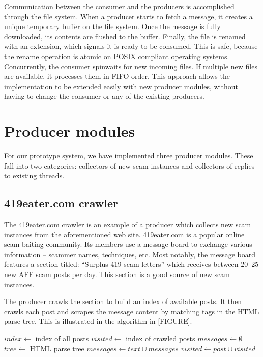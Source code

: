 Communication between the consumer and the producers is accomplished through the file system. When a producer starts to fetch a message, it creates a unique temporary buffer on the file system. Once the message is fully downloaded, its contents are flushed to the buffer. Finally, the file is renamed with an extension, which signals it is ready to be consumed. This is safe, because the rename operation is atomic on POSIX compliant operating systems. Concurrently, the consumer spinwaits for new incoming files. If multiple new files are available, it processes them in FIFO order. This approach allows the implementation to be extended easily with new producer modules, without having to change the consumer or any of the existing producers.

\section{Producer modules}
For our prototype system, we have implemented three producer modules. These fall into two categories: collectors of new scam instances and collectors of replies to existing threads.

\subsection{419eater.com crawler}
The 419eater.com crawler is an example of a producer which collects new scam instances from the aforementioned web site. 419eater.com is a popular online scam baiting community. Its members use a message board to exchange various information -- scammer names, techniques, etc. Most notably, the message board features a section titled: ``Surplus 419 scam letters'' which receives between 20--25 new AFF scam posts per day. This section is a good source of new scam instances.

The producer crawls the section to build an index of available posts. It then crawls each post and scrapes the message content by matching tags in the HTML parse tree. This is illustrated in the algorithm in [FIGURE].

\begin{algorithmic}
\State $index\gets $ index of all posts
\State $visited\gets $ index of crawled posts
\State $messages\gets \emptyset$ 
	\State $tree \gets $ HTML parse tree
			\State $messages \gets text \cup messages$ 
		\EndIf
	\EndFor
	\State $visited \gets post \cup visited$
\EndFor
\end{algorithmic}

